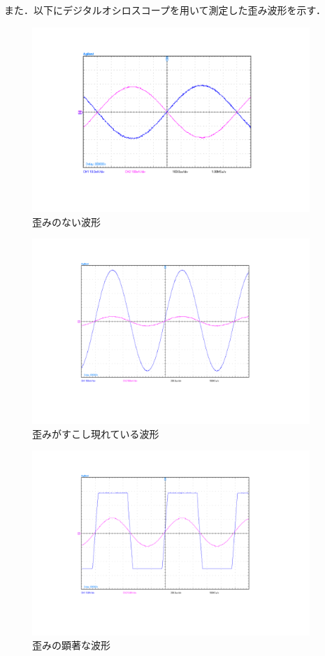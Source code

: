 \documentclass[10pt, a4j, dvipdfmx]{jarticle}
\makeatletter
\newcommand{\figcaption}[1]{\def\@captype{figure}\caption{#1}}
\makeatother
\begin{document}
また．以下にデジタルオシロスコープを用いて測定した歪み波形を示す．
\begin{figure}[H]
    \centering
    \includegraphics[height=70mm]{Result/Reverse/reverse-Hannten(input_10mV_output_95mV).png}
    \figcaption{歪みのない波形}
    \label{fig:7-2-2}
\end{figure}
\begin{figure}[H]
    \centering
    \includegraphics[height=70mm]{Result/Reverse/reverse-Hihannten(input_1000mV_output_9600mV).png}
    \figcaption{歪みがすこし現れている波形}
    \label{fig:7-2-3}
\end{figure}
\begin{figure}[H]
    \centering
    \includegraphics[height=70mm]{Result/Reverse/reverse-Hihannten(input_3000mV_output_11900mV).png}
    \figcaption{歪みの顕著な波形}
    \label{fig:7-2-4}
\end{figure}
\end{document}
